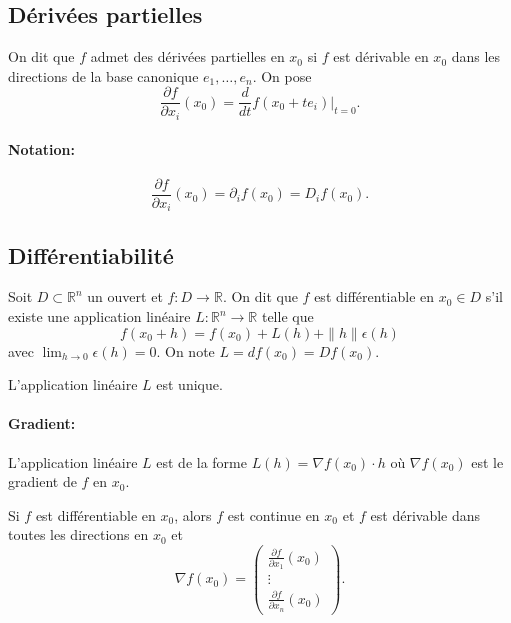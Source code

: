 \documentclass[oneside]{book}
\begin{document}
\subsection{Dérivées partielles}

\begin{definition}
On dit que $f$ admet des dérivées partielles en $x_0$ si $f$ est dérivable en $x_0$ dans les directions de la base canonique $e_1, \ldots, e_n$. On pose
\[
\frac{\partial f}{\partial x_i}(x_0) = \frac{d}{dt} f(x_0 + te_i) \Big|_{t=0}.
\]
\end{definition}

\paragraph{\textbf{Notation:}}
\[
\frac{\partial f}{\partial x_i}(x_0) = \partial_i f(x_0) = D_i f(x_0).
\]

\subsection{Différentiabilité}

\begin{definition}
Soit $D \subset \mathbb{R}^n$ un ouvert et $f: D \rightarrow \mathbb{R}$. On dit que $f$ est différentiable en $x_0 \in D$ s'il existe une application linéaire $L: \mathbb{R}^n \rightarrow \mathbb{R}$ telle que
\[
f(x_0 + h) = f(x_0) + L(h) + \|h\| \epsilon(h)
\]
avec $\lim_{h \rightarrow 0} \epsilon(h) = 0$.
On note $L = df(x_0) = Df(x_0)$.
\end{definition}

\begin{remark}
L'application linéaire $L$ est unique.
\end{remark}

\paragraph{\textbf{Gradient:}} L'application linéaire $L$ est de la forme $L(h) = \nabla f(x_0) \cdot h$ où $\nabla f(x_0)$ est le gradient de $f$ en $x_0$.

\begin{lemma}
Si $f$ est différentiable en $x_0$, alors $f$ est continue en $x_0$ et $f$ est dérivable dans toutes les directions en $x_0$ et
\[
\nabla f(x_0) = \begin{pmatrix}
\frac{\partial f}{\partial x_1}(x_0) \\
\vdots \\
\frac{\partial f}{\partial x_n}(x_0)
\end{pmatrix}.
\]
\end{lemma}
\end{document}
